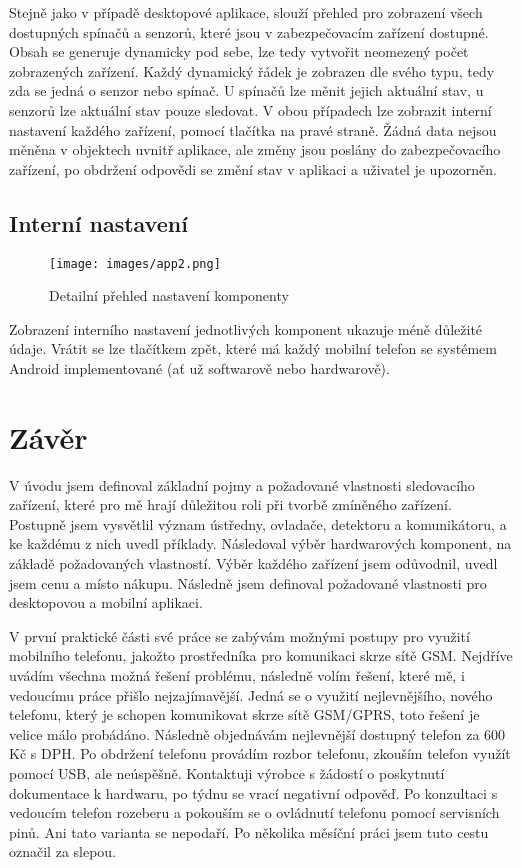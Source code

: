 \documentclass[FM,MP]{tulthesis}  %
\begin{document}
Stejně jako v případě desktopové aplikace, slouží přehled pro zobrazení všech dostupných spínačů a senzorů, které jsou v zabezpečovacím zařízení dostupné. Obsah se generuje dynamicky pod sebe, lze tedy vytvořit neomezený počet zobrazených zařízení. Každý dynamický řádek je zobrazen dle svého typu, tedy zda se jedná o senzor nebo spínač. U spínačů lze měnit jejich aktuální stav, u senzorů lze aktuální stav pouze sledovat. V obou případech lze zobrazit interní nastavení každého zařízení, pomocí tlačítka na pravé straně. Žádná data nejsou měněna v objektech uvnitř aplikace, ale změny jsou poslány do zabezpečovacího zařízení, po obdržení odpovědi se změní stav v aplikaci a uživatel je upozorněn.

\section{Interní nastavení}
\begin{figure}[H]
\begin{center}
\texttt{[image: images/app2.png]}
\caption{Detailní přehled nastavení komponenty}
\label{image}
\end{center}
\end{figure}

Zobrazení interního nastavení jednotlivých komponent ukazuje méně důležité údaje. Vrátit se lze tlačítkem zpět, které má každý mobilní telefon se systémem Android implementované (ať už softwarově nebo hardwarově).


\chapter{Závěr}
V úvodu jsem definoval základní pojmy a požadované vlastnosti sledovacího zařízení, které pro mě hrají důležitou roli při tvorbě zmíněného zařízení. Postupně jsem vysvětlil význam ústředny, ovladače, detektoru a komunikátoru, a ke každému z nich uvedl příklady. Následoval výběr hardwarových komponent, na základě požadovaných vlastností. Výběr každého zařízení jsem odůvodnil, uvedl jsem cenu a místo nákupu. Následně jsem definoval požadované vlastnosti pro desktopovou a mobilní aplikaci.

V první praktické části své práce se zabývám možnými postupy pro využití mobilního telefonu, jakožto prostředníka pro komunikaci skrze sítě GSM. Nejdříve uvádím všechna možná řešení problému, následně volím řešení, které mě, i vedoucímu práce přišlo nejzajímavější. Jedná se o využití nejlevnějšího, nového telefonu, který je schopen komunikovat skrze sítě GSM/GPRS, toto řešení je velice málo probádáno. Následně objednávám nejlevnější dostupný telefon za 600 Kč s DPH. Po obdržení telefonu provádím rozbor telefonu, zkouším telefon využít pomocí USB, ale neúspěšně. Kontaktuji výrobce s žádostí o poskytnutí dokumentace k hardwaru, po týdnu se vrací negativní odpověď. Po konzultaci s vedoucím telefon rozeberu a pokouším se o ovládnutí telefonu pomocí servisních pinů. Ani tato varianta se nepodaří. Po několika měsíční práci jsem tuto cestu označil za slepou.
\end{document}
